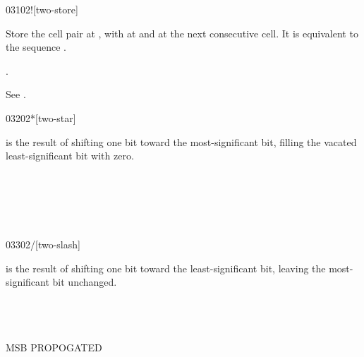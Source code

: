 \begin{worddef}{0310}{2!}[two-store]
\item {}

	Store the cell pair  at , with
	 at  and  at the next
	consecutive cell. It is equivalent to the sequence
	  \word{!}  \word{!}.

\see {}.

	\begin{testing} %
		See .
	\end{testing}
\end{worddef}


\begin{worddef}{0320}{2*}[two-star]
\item {}

	 is the result of shifting  one bit toward
	the most-significant bit, filling the vacated least-significant
	bit with zero.

	\begin{testing} %
		 \\
		 \\
		 \\
		 \\
	\end{testing}
\end{worddef}


\begin{worddef}{0330}{2/}[two-slash]
\item {}

	 is the result of shifting  one bit toward
	the least-significant bit, leaving the most-significant bit
	unchanged.

	\begin{testing} %
		 \\
		 \\
		 \\
		  MSB PROPOGATED \\
		 \\
	\end{testing}
\end{worddef}


